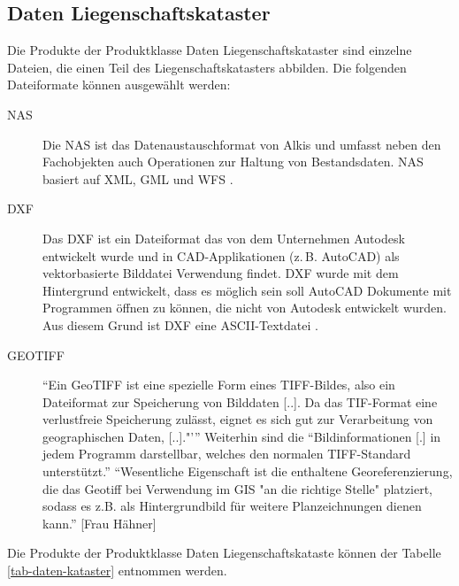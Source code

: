 \subsection{Daten Liegenschaftskataster}

Die Produkte der Produktklasse Daten Liegenschaftskataster sind einzelne Dateien, die einen Teil des Liegenschaftskatasters abbilden. Die folgenden Dateiformate können ausgewählt werden:
\begin{description}
\item[NAS] Die \ac{NAS} ist das Datenaustauschformat von Alkis und umfasst neben den Fachobjekten auch Operationen zur Haltung von Bestandsdaten. \ac{NAS} basiert auf \ac{XML}, \ac{GML} und \ac{WFS} \autocite[vgl.][]{sachsen-nas}.

\item[DXF] Das \ac{DXF} ist ein Dateiformat das von dem Unternehmen Autodesk entwickelt wurde und in \ac{CAD}-Applikationen (z.\,B. AutoCAD) als vektorbasierte Bilddatei Verwendung findet.
\ac{DXF} wurde mit dem Hintergrund entwickelt, dass es möglich sein soll AutoCAD Dokumente mit Programmen öffnen zu können, die nicht von Autodesk entwickelt wurden. Aus diesem Grund ist \ac{DXF} eine ASCII-Textdatei \autocite[vgl.][]{fileinfo-dxf}.

\item[GEOTIFF] \enquote{Ein GeoTIFF ist eine spezielle Form eines TIFF-Bildes, also ein Dateiformat zur Speicherung von Bilddaten [..]. Da das TIF-Format eine verlustfreie Speicherung zulässt, eignet es sich gut zur Verarbeitung von geographischen Daten, [..]."'} \autocite{wiki-geotiff} Weiterhin sind die \enquote{Bildinformationen [.] in jedem Programm darstellbar, welches den normalen TIFF-Standard unterstützt.}  \autocite{wiki-geotiff} \enquote{Wesentliche Eigenschaft ist die enthaltene Georeferenzierung, die das Geotiff bei Verwendung im GIS "an die richtige Stelle" platziert, sodass es z.B. als Hintergrundbild für weitere Planzeichnungen dienen kann.} [Frau Hähner] 
\end{description}

Die Produkte der Produktklasse Daten Liegenschaftskataste können der Tabelle \ref{tab-daten-kataster} entnommen werden.

